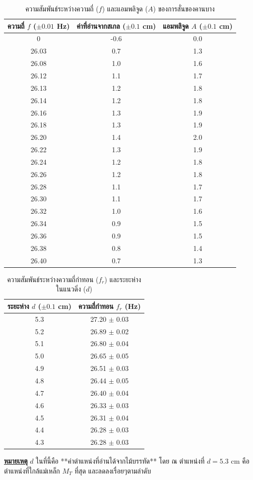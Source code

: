 \documentclass[11pt,a4paper]{article}
\begin{document}
\begin{table}[htbp]
\centering
\caption{ความสัมพันธ์ระหว่างความถี่ ($f$) และแอมพลิจูด ($A$) ของการสั่นของคานบาง}
\renewcommand{\arraystretch}{1.2}
\begin{tabular}{|c|c|c|}
\hline
ความถี่ $f$ ($\pm 0.01$ Hz) & ค่าที่อ่านจากสเกล ($\pm 0.1$ cm) & แอมพลิจูด $A$ ($\pm 0.1$ cm) \\
\hline
0 & -0.6 & 0.0 \\
26.03 & 0.7 & 1.3 \\
26.08 & 1.0 & 1.6 \\
26.12 & 1.1 & 1.7 \\
26.13 & 1.2 & 1.8 \\
26.14 & 1.2 & 1.8 \\
26.16 & 1.3 & 1.9 \\
26.18 & 1.3 & 1.9 \\
26.20 & 1.4 & 2.0 \\
26.22 & 1.3 & 1.9 \\
26.24 & 1.2 & 1.8 \\
26.26 & 1.2 & 1.8 \\
26.28 & 1.1 & 1.7 \\
26.30 & 1.1 & 1.7 \\
26.32 & 1.0 & 1.6 \\
26.34 & 0.9 & 1.5 \\
26.36 & 0.9 & 1.5 \\
26.38 & 0.8 & 1.4 \\
26.40 & 0.7 & 1.3 \\
\hline
\end{tabular}
\end{table}

\begin{table}[htbp]
\centering
\caption{ความสัมพันธ์ระหว่างความถี่กำทอน ($f_r$) และระยะห่างในแนวดิ่ง ($d$)}
\renewcommand{\arraystretch}{1.2}
\begin{tabular}{|c|c|}
\hline
ระยะห่าง $d$ ($\pm 0.1$ cm) & ความถี่กำทอน $f_r$ (Hz) \\
\hline
5.3 & 27.20 $\pm$ 0.03 \\
5.2 & 26.89 $\pm$ 0.02 \\
5.1 & 26.80 $\pm$ 0.04 \\
5.0 & 26.65 $\pm$ 0.05 \\
4.9 & 26.51 $\pm$ 0.03 \\
4.8 & 26.44 $\pm$ 0.05 \\
4.7 & 26.40 $\pm$ 0.04 \\
4.6 & 26.33 $\pm$ 0.03 \\
4.5 & 26.31 $\pm$ 0.04 \\
4.4 & 26.28 $\pm$ 0.03 \\
4.3 & 26.28 $\pm$ 0.03 \\
\hline
\end{tabular}
\end{table}
\textbf{\underline{หมายเหตุ}} $d$ ในที่นี้คือ **ค่าตำแหน่งที่อ่านได้จากไม้บรรทัด** โดย ณ ตำแหน่งที่ $d=5.3$ cm คือตำแหน่งที่ใกล้แม่เหล็ก $M_T$ ที่สุด และลดลงเรื่อยๆตามลำดับ
\end{document}
